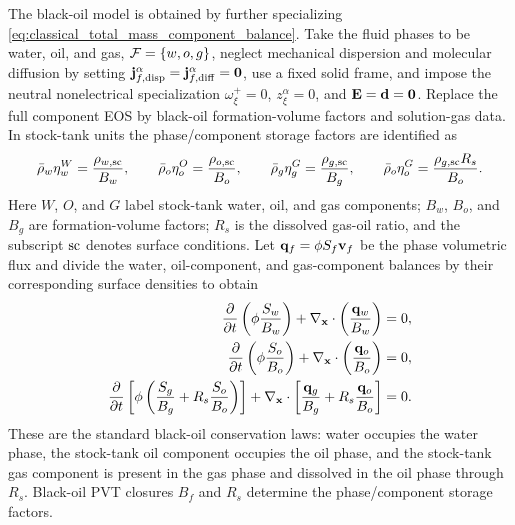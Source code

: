 The black-oil model is obtained by further specializing
\eqref{eq:classical_total_mass_component_balance}.  Take the fluid phases to be
water, oil, and gas, \(\mathcal{F}=\{w,o,g\}\), neglect mechanical dispersion and
molecular diffusion by setting
\(\mathbf{j}_{f,{\rm disp}}^\alpha=\mathbf{j}_{f,{\rm diff}}^\alpha=\mathbf{0}\), use a
fixed solid frame, and impose the neutral nonelectrical specialization
	\(\omega_\xi^+=0\), \(z_\xi^\alpha=0\), and \(\mathbf{E}=\mathbf{d}=\mathbf{0}\).
	Replace the full
component EOS by black-oil formation-volume factors and solution-gas data.  In
stock-tank units the phase/component storage factors are identified as
%
\begin{equation}
	\bar\rho_w\eta_w^W=\frac{\rho_{w,{\rm sc}}}{B_w},
	\qquad
	\bar\rho_o\eta_o^O=\frac{\rho_{o,{\rm sc}}}{B_o},
	\qquad
	\bar\rho_g\eta_g^G=\frac{\rho_{g,{\rm sc}}}{B_g},
	\qquad
	\bar\rho_o\eta_o^G=\frac{\rho_{g,{\rm sc}}R_s}{B_o}.
	\label{eq:black_oil_storage_identifications}
\end{equation}
%
Here \(W\), \(O\), and \(G\) label stock-tank water, oil, and gas components;
\(B_w\), \(B_o\), and \(B_g\) are formation-volume factors; \(R_s\) is the
dissolved gas-oil ratio, and the subscript \({\rm sc}\) denotes surface
conditions.  Let \(\mathbf{q}_f=\phi S_f\mathbf{v}_f\) be the phase volumetric flux and
divide the water, oil-component, and gas-component balances by their
corresponding surface densities to obtain
%
\begin{align}
	\frac{\partial}{\partial t}\left(\phi\frac{S_w}{B_w}\right)
	+\nabla_{\mathbf{x}}\cdot\left(\frac{\mathbf{q}_w}{B_w}\right)
	 & = 0,
	\label{eq:black_oil_water_balance} \\
	\frac{\partial}{\partial t}\left(\phi\frac{S_o}{B_o}\right)
	+\nabla_{\mathbf{x}}\cdot\left(\frac{\mathbf{q}_o}{B_o}\right)
	 & = 0,
	\label{eq:black_oil_oil_balance}   \\
	\frac{\partial}{\partial t}
	\left[
		\phi\left(\frac{S_g}{B_g}+R_s\frac{S_o}{B_o}\right)
		\right]
	+\nabla_{\mathbf{x}}\cdot
	\left[
		\frac{\mathbf{q}_g}{B_g}
			+R_s\frac{\mathbf{q}_o}{B_o}
		\right]
	 & = 0 .
	\label{eq:black_oil_gas_balance}
\end{align}
%
These are the standard black-oil conservation laws: water occupies the
water phase, the stock-tank oil component occupies the oil phase, and the
stock-tank gas component is present in the gas phase and dissolved in the oil
phase through \(R_s\).  Black-oil PVT closures \(B_f\) and \(R_s\) determine
the phase/component storage factors.

